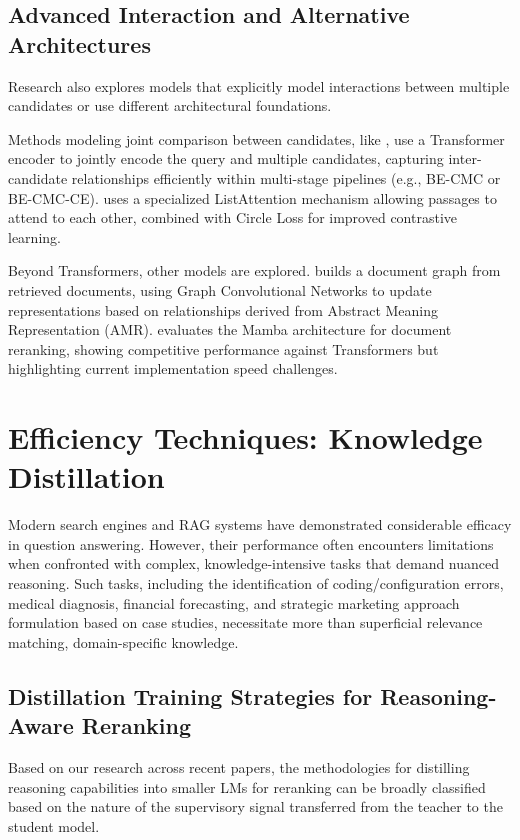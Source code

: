 \documentclass[runningheads]{llncs}
\begin{document}
\subsection{Advanced Interaction and Alternative Architectures}

Research also explores models that explicitly model interactions between multiple candidates or use different architectural foundations.

Methods modeling joint comparison between candidates, like \cite{song2024comparingneighborsmakeseasy}, use a Transformer encoder to jointly encode the query and multiple candidates, capturing inter-candidate relationships efficiently within multi-stage pipelines (e.g., BE-CMC or BE-CMC-CE). \cite{liu2025listconrankercontrastivetextreranker} uses a specialized ListAttention mechanism allowing passages to attend to each other, combined with Circle Loss\cite{sun2020circlelossunifiedperspective} for improved contrastive learning.

Beyond Transformers, other models are explored. \cite{dong2024dontforgetconnectimproving} builds a document graph from retrieved documents, using Graph Convolutional Networks\cite{paper25_dl} to update representations based on relationships derived from Abstract Meaning Representation (AMR). \cite{xu2024rankmambabenchmarkingmambasdocument} evaluates the Mamba architecture\cite{gu2024mambalineartimesequencemodeling} for document reranking, showing competitive performance against Transformers but highlighting current implementation speed challenges.

\section{Efficiency Techniques: Knowledge Distillation} \label{kd-rerankers}
Modern search engines and RAG systems have demonstrated considerable efficacy in question answering. However, their performance often encounters limitations when confronted with complex, knowledge-intensive tasks that demand nuanced reasoning. Such tasks, including the identification of coding/configuration errors, medical diagnosis, financial forecasting, and strategic marketing approach formulation based on case studies, necessitate more than superficial relevance matching, domain-specific knowledge.

\subsection{Distillation Training Strategies for Reasoning-Aware Reranking}
Based on our research across recent papers, the methodologies for distilling reasoning capabilities into smaller LMs for reranking can be broadly classified based on the nature of the supervisory signal transferred from the teacher to the student model. 
\end{document}
